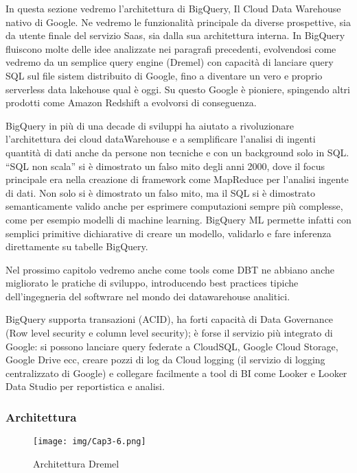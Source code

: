 \documentclass[a4paper,12pt]{report}
\begin{document}
In questa sezione vedremo l’architettura di BigQuery, Il Cloud Data Warehouse nativo di Google.
\noindent
Ne vedremo le funzionalità principale da diverse prospettive, sia da utente finale del servizio Saas, sia dalla sua architettura interna. In BigQuery fluiscono molte delle idee analizzate nei paragrafi precedenti, evolvendosi come vedremo da un semplice query engine (Dremel) con capacità di lanciare query SQL sul file sistem distribuito di Google, fino a diventare un vero e proprio serverless data lakehouse qual è oggi. Su questo Google è pioniere, spingendo altri prodotti come Amazon Redshift a evolvorsi di conseguenza.

\noindent
BigQuery in più di una decade di sviluppi ha aiutato a rivoluzionare l’architettura dei cloud dataWarehouse e a semplificare l’analisi di ingenti quantità di dati anche da persone non tecniche e con un background solo in SQL. “SQL non scala” si è dimostrato un falso mito degli anni 2000, dove il focus principale era nella creazione di framework come MapReduce per l’analisi ingente di dati. Non solo si è dimostrato un falso mito, ma il SQL si è dimostrato semanticamente valido anche per esprimere computazioni sempre più complesse, come per esempio modelli di machine learning. BigQuery ML permette infatti con semplici primitive dichiarative di creare un modello, validarlo e fare inferenza direttamente su tabelle BigQuery.

\noindent
Nel prossimo capitolo vedremo anche come tools come DBT ne abbiano anche migliorato le pratiche di sviluppo, introducendo best practices tipiche dell’ingegneria del softwrare nel mondo dei datawarehouse analitici.

\noindent
BigQuery supporta transazioni (ACID), ha forti capacità di Data Governance (Row level security e column level security); è forse il servizio più integrato di Google: si possono lanciare query federate a CloudSQL, Google Cloud Storage, Google Drive ecc, creare pozzi di log da Cloud logging (il servizio di logging centralizzato di Google) e collegare facilmente a tool di BI come Looker e Looker Data Studio per reportistica e analisi.


\subsubsection{Architettura}

\begin{figure}[h]
    \centering
    \texttt{[image: img/Cap3-6.png]}
    \caption{Architettura Dremel}
\end{figure}
\end{document}

